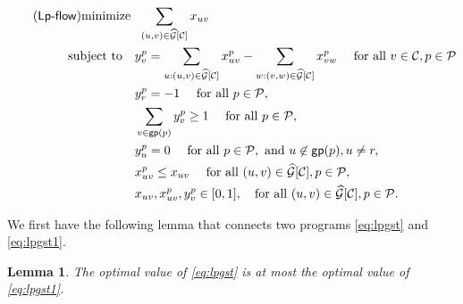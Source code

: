 \documentclass[11pt]{article}
\newcommand{\calC}{{\mathcal C}}
\newcommand{\calP}{{\mathcal P}}
\newcommand{\calG}{{\mathcal G}}
\newcommand{\lpflow}{\mathsf{Lp}\text{-}\mathsf{flow}}
\newcommand{\group}{\mathsf{gp}}
\newtheorem{lemma}{Lemma}
\begin{document}
\begin{align}
\label{eq:lpgst}
\tag{$\lpflow$}
\mathrm{minimize} \,\, & \,\, \sum_{(u,v)\in \widehat{\calG}[\calC]} x_{uv} \\
\mathrm{subject\,\, to} \quad & y^p_v= \sum_{u:(u,v) \in \widehat{\calG}[\calC]} x^p_{uv}-\sum_{w:(v,w) \in \widehat{\calG}[\calC]}x^p_{vw} \quad \text{ for all }v\in \calC, p\in \calP\notag \\
& y^p_r=-1                                                                  \quad \text{ for all }p\in \calP, \notag \\
& \sum_{v\in \group(p)}y^p_v\geq 1                              \quad \text{ for all }p\in \calP, \notag \\
& y^p_u=0                                                                   \quad \text{ for all }p\in \calP, \text{ and } u\not\in \group(p), u\ne r,\notag \\
& x^p_{uv}\leq x_{uv}                               \quad\text{ for all } (u,v) \in \widehat{\calG}[\calC], p\in \calP, \notag \\
& x_{uv}, x^p_{uv}, y^p_v\in [0,1],                                        \quad \text{for all } (u,v) \in \widehat{\calG}[\calC], p\in \calP \notag.
\end{align}

We first have the following lemma that connects two programs \ref{eq:lpgst} and \ref{eq:lpgst1}.


\begin{lemma}
	\label{lm:optimal}
	The optimal value of \ref{eq:lpgst} is at most the optimal value of \ref{eq:lpgst1}.
\end{lemma}
\end{document}
